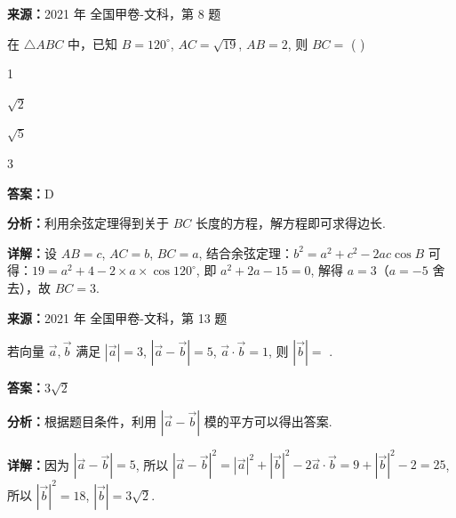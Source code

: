 \begin{question}[points=5]
\textbf{来源：}2021 年 全国甲卷-文科，第 8 题\par
在 $\triangle ABC$ 中，已知 $B=120^{\circ}$, $AC=\sqrt{19}$, $AB=2$, 则 $BC=$ ( )
\begin{choices}
  \item 1
  \item $\sqrt{2}$
  \item $\sqrt{5}$
  \item 3
\end{choices}
\begin{solution}
\textbf{答案：}D

\textbf{分析：}利用余弦定理得到关于 $BC$ 长度的方程，解方程即可求得边长.

\textbf{详解：}设 $AB=c$, $AC=b$, $BC=a$, 结合余弦定理：$b^2 = a^2 + c^2 - 2ac \cos B$ 可得：$19 = a^2 + 4 - 2 \times a \times \cos 120^{\circ}$, 即 $a^2 + 2a -15 = 0$, 解得 $a=3$（$a=-5$ 舍去），故 $BC=3$.
\end{solution}
\end{question}

\begin{question}[points=5]
\textbf{来源：}2021 年 全国甲卷-文科，第 13 题\par
若向量 $\vec{a}, \vec{b}$ 满足 $|\vec{a}|=3$, $|\vec{a}-\vec{b}|=5$, $\vec{a}\cdot\vec{b}=1$, 则 $|\vec{b}|=$ .
\fillin[{$3\sqrt{2}$}]
\begin{solution}
\textbf{答案：}$3\sqrt{2}$

\textbf{分析：}根据题目条件，利用 $|\vec{a}-\vec{b}|$ 模的平方可以得出答案.

\textbf{详解：}因为 $|\vec{a}-\vec{b}|=5$, 所以 $|\vec{a}-\vec{b}|^2 = |\vec{a}|^2 + |\vec{b}|^2 - 2\vec{a}\cdot\vec{b} = 9 + |\vec{b}|^2 - 2 = 25$, 所以 $|\vec{b}|^2 = 18$, $|\vec{b}| = 3\sqrt{2}$.
\end{solution}
\end{question}

